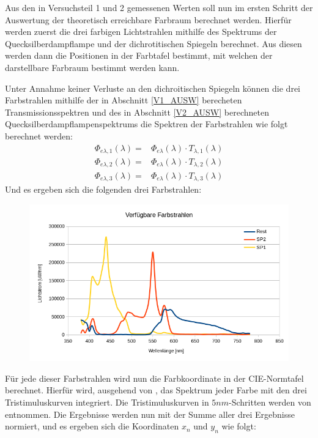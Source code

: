 
Aus den in Versuchsteil 1 und 2 gemessenen Werten soll nun im ersten Schritt der Auswertung der theoretisch erreichbare Farbraum berechnet werden. Hierfür werden zuerst die drei farbigen Lichtstrahlen mithilfe des Spektrums der Quecksilberdampflampe und der dichrotitischen Spiegeln berechnet. Aus diesen werden dann die Positionen in der Farbtafel bestimmt, mit welchen der darstellbare Farbraum bestimmt werden kann.

Unter Annahme keiner Verluste an den dichroitischen Spiegeln können die drei Farbstrahlen mithilfe der in Abschnitt \ref{V1_AUSW} berecheten Transmissionsspektren und des in Abschnitt \ref{V2_AUSW} berechneten Quecksilberdampflampenspektrums die Spektren der Farbstrahlen wie folgt berechnet werden:
\begin{eqnarray}
\Phi_{e\lambda,1}(\lambda) = & \Phi_{e\lambda}(\lambda)\cdot  T_{\lambda,1}(\lambda) \\
\Phi_{e\lambda,2}(\lambda) = & \Phi_{e\lambda}(\lambda)\cdot  T_{\lambda,2}(\lambda) \\
\Phi_{e\lambda,3}(\lambda) = & \Phi_{e\lambda}(\lambda) \cdot T_{\lambda,3}(\lambda)
\end{eqnarray}
Und es ergeben sich die folgenden drei Farbstrahlen:

\begin{figure}[h]
	\centering
	\includegraphics[scale=0.7]{Images/A_Farbstrahlen.png}
\end{figure}

Für jede dieser Farbstrahlen wird nun die Farbkoordinate in der CIE-Normtafel berechnet. Hierfür wird, ausgehend von \cite[Seite 26]{AML_SKRIPT}, das Spektrum jeder Farbe mit den drei Tristimuluskurven integriert. Die Tristimuluskurven in $5nm$-Schritten werden von \cite{TRI_STIM} entnommen. Die Ergebnisse werden nun mit der Summe aller drei Ergebnisse normiert, und es ergeben sich die Koordinaten $x_n$ und $y_n$ wie folgt:

